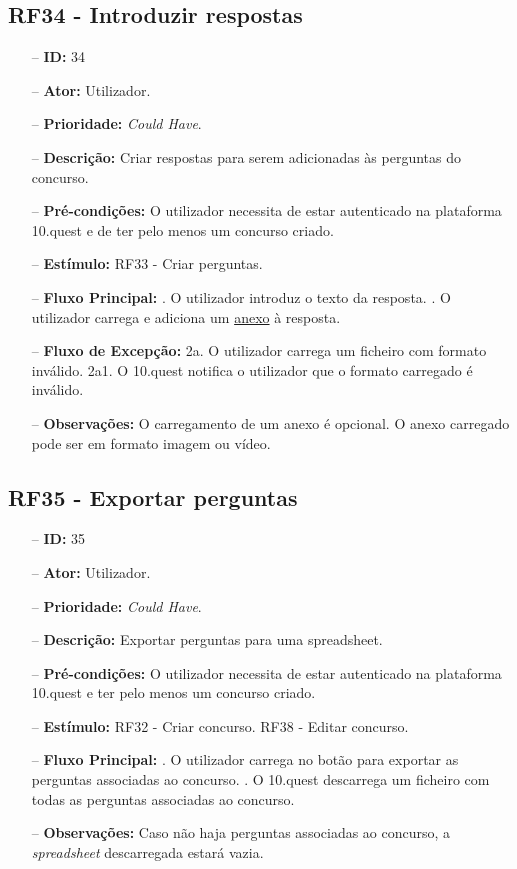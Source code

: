 \subsection{RF34 - Introduzir respostas}
\begin{itemize}
	\item[--] \textbf{ID:} 34
	\item[--]  \textbf{Ator:} Utilizador.
	\item[--]  \textbf{Prioridade:} \textit{Could Have}.
	\item[--]  \textbf{Descrição:} Criar respostas para serem adicionadas às perguntas do concurso.
	\item[--]  \textbf{Pré-condições:} O utilizador necessita de estar autenticado na plataforma 10.quest e de ter pelo menos um concurso criado.
	\item[--]  \textbf{Estímulo:} RF33 - Criar perguntas.
	\item[--]  \textbf{Fluxo Principal:} 
	. O utilizador introduz o texto da resposta.
	. O utilizador carrega e adiciona um \underline{anexo} à resposta.
	\item[--]  \textbf{Fluxo de Excepção:} 
	\subitem 2a. O utilizador carrega um ficheiro com formato inválido.
	\subitem 2a1. O 10.quest notifica o utilizador que o formato carregado é inválido.
	\item[--]  \textbf{Observações:} O carregamento de um anexo é opcional. O anexo carregado pode ser em formato imagem ou vídeo.
\end{itemize}
\newpage

\subsection{RF35 - Exportar perguntas}
\begin{itemize}
	\item[--] \textbf{ID:} 35
	\item[--]  \textbf{Ator:} Utilizador.
	\item[--]  \textbf{Prioridade:} \textit{Could Have}.
	\item[--]  \textbf{Descrição:} Exportar perguntas para uma spreadsheet.
	\item[--]  \textbf{Pré-condições:} O utilizador necessita de estar autenticado na plataforma 10.quest e ter pelo menos um concurso criado.
	\item[--]  \textbf{Estímulo:}  
	\subitem RF32 - Criar concurso.
	\subitem RF38 - Editar concurso.
	\item[--]  \textbf{Fluxo Principal:} 
	. O utilizador carrega no botão para exportar as perguntas associadas ao concurso.
	. O 10.quest descarrega um ficheiro  com todas as perguntas associadas ao concurso.
	\item[--]  \textbf{Observações:} Caso não haja perguntas associadas ao concurso, a  \textit{spreadsheet} descarregada estará vazia.
\end{itemize}
\newpage

